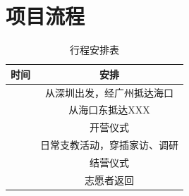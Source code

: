 \documentclass[12pt]{ctexart}
\begin{document}
\section{项目流程}
\begin{table}[!ht]
\centering
\begin{tabular}{|c|c|}
\hline
时间 & 安排 \\
\hline
 &  从深圳出发，经广州抵达海口 \\
\hline
 & 从海口东抵达XXX \\
\hline
 & 开营仪式\\
\hline
 & 日常支教活动，穿插家访、调研 \\
\hline
 & 结营仪式 \\
\hline
 & 志愿者返回 \\
\hline
\end{tabular}
\caption{行程安排表}\label{route}
\end{table}
\end{document}
